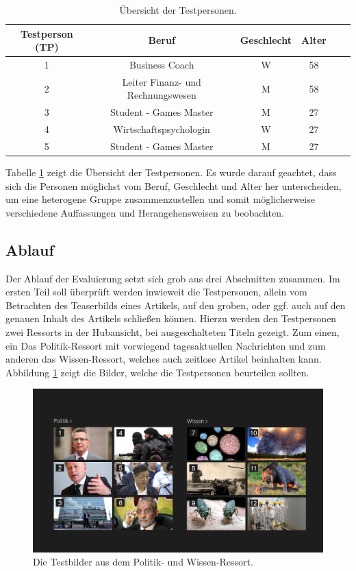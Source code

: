 \documentclass[12pt,a4paper,bibtotoc,abstracton]{scrartcl}
\begin{document}
\begin{table}[h]
\centering
\begin{tabular}{|c|c|c|c|c|c|}
\hline 
\rule[-1ex]{0pt}{3.5ex} \textbf{Testperson (TP)} & \textbf{Beruf} & \textbf{Geschlecht} & \textbf{Alter} \\ 
\hline 
\rule[-1ex]{0pt}{2.5ex} 1 & Business Coach & W & 58 \\ 
\hline 
\rule[-1ex]{0pt}{2.5ex} 2 & Leiter Finanz- und Rechnungswesen & M & 58 \\ 
\hline 
\rule[-1ex]{0pt}{2.5ex} 3 & Student - Games Master & M & 27  \\ 
\hline 
\rule[-1ex]{0pt}{2.5ex} 4 & Wirtschaftspsychologin & W & 27 \\ 
\hline 
\rule[-1ex]{0pt}{2.5ex} 5 & Student - Games Master & M & 27 \\ 
\hline 
\end{tabular} 
\caption{Übersicht der Testpersonen.}
\label{tab:testpersonen}
\end{table}

Tabelle \ref{tab:testpersonen} zeigt die Übersicht der Testpersonen. Es wurde darauf geachtet, dass sich die Personen möglichst vom Beruf, Geschlecht und Alter her unterscheiden, um eine heterogene Gruppe zusammenzustellen und somit möglicherweise verschiedene Auffassungen und Herangehensweisen zu beobachten.


\subsection{Ablauf}
\label{subsec:ablauf}
Der Ablauf der Evaluierung setzt sich grob aus drei Abschnitten zusammen. Im ersten Teil soll überprüft werden inwieweit die Testpersonen, allein vom Betrachten des Teaserbilds eines Artikels, auf den groben, oder ggf. auch auf den genauen Inhalt des Artikels schließen können. Hierzu werden den Testpersonen zwei Ressorts in der Hubansicht, bei ausgeschalteten Titeln gezeigt. Zum einen, ein Das Politik-Ressort mit vorwiegend tagesaktuellen Nachrichten und zum anderen das Wissen-Ressort, welches auch zeitlose Artikel beinhalten kann. Abbildung \ref{fig:testbilder} zeigt die Bilder, welche die Testpersonen beurteilen sollten.

\begin{figure}[h]
	\centering
	\includegraphics[width=\textwidth]{Evaluierung/Testbilder/collage_politik_wissen_numbers.png} 
	\caption{Die Testbilder aus dem Politik- und Wissen-Ressort.}
	\label{fig:testbilder}
\end{figure}  
\end{document}
